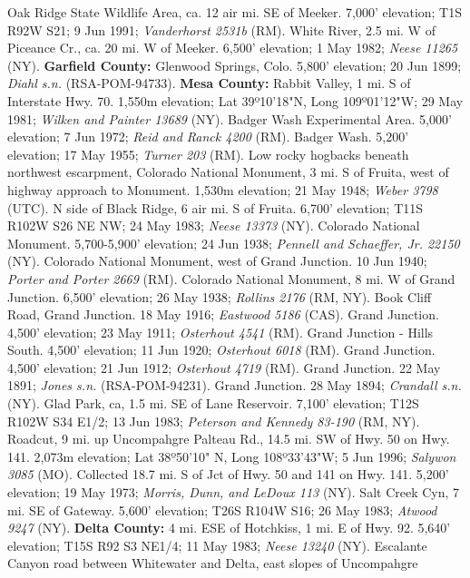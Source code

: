 Oak Ridge State Wildlife Area, ca. 12 air mi. SE of Meeker. 7,000' elevation;
T1S R92W S21; 9 Jun 1991; \textit{Vanderhorst 2531b} (RM).
White River, 2.5 mi. W of Piceance Cr., ca. 20 mi. W of Meeker.
6,500' elevation; 1 May 1982; \textit{Neese 11265} (NY).
  \textbf{Garfield County:}
Glenwood Springs, Colo. 5,800' elevation; 20 Jun 1899;
\textit{Diahl s.n.} (RSA-POM-94733).
  \textbf{Mesa County:}
Rabbit Valley, 1 mi. S of Interstate Hwy. 70. 1,550m elevation; Lat 39º10'18"N,
Long 109º01'12"W; 29 May 1981; \textit{Wilken and Painter 13689} (NY).
Badger Wash Experimental Area. 5,000' elevation; 7 Jun 1972;
\textit{Reid and Ranck 4200} (RM).
Badger Wash. 5,200' elevation; 17 May 1955; \textit{Turner 203} (RM).
Low rocky hogbacks beneath northwest escarpment, Colorado National Monument,
3 mi. S of Fruita, west of highway approach to Monument. 1,530m elevation;
21 May 1948; \textit{Weber 3798} (UTC).
N side of Black Ridge, 6 air mi. S of Fruita. 6,700' elevation;
T11S R102W S26 NE NW; 24 May 1983; \textit{Neese 13373} (NY).
Colorado National Monument. 5,700-5,900' elevation; 24 Jun 1938;
\textit{Pennell and Schaeffer, Jr. 22150} (NY).
Colorado National Monument, west of Grand Junction. 10 Jun 1940;
\textit{Porter and Porter 2669} (RM).
Colorado National Monument, 8 mi. W of Grand Junction. 6,500' elevation;
26 May 1938; \textit{Rollins 2176} (RM, NY).
Book Cliff Road, Grand Junction. 18 May 1916; \textit{Eastwood 5186} (CAS).
Grand Junction. 4,500' elevation; 23 May 1911; \textit{Osterhout 4541} (RM).
Grand Junction - Hills South. 4,500' elevation; 11 Jun 1920;
\textit{Osterhout 6018} (RM).
Grand Junction. 4,500' elevation; 21 Jun 1912; \textit{Osterhout 4719} (RM).
Grand Junction. 22 May 1891; \textit{Jones s.n.} (RSA-POM-94231).
Grand Junction. 28 May 1894; \textit{Crandall s.n.} (NY).
Glad Park, ca, 1.5 mi. SE of Lane Reservoir. 7,100' elevation;
T12S R102W S34 E1/2; 13 Jun 1983; \textit{Peterson and Kennedy 83-190} (RM, NY).
Roadcut, 9 mi. up Uncompahgre Palteau Rd., 14.5 mi. SW of Hwy. 50 on Hwy. 141.
2,073m elevation; Lat 38º50'10" N, Long 108º33'43"W; 5 Jun 1996;
\textit{Salywon 3085} (MO).
Collected 18.7 mi. S of Jct of Hwy. 50 and 141 on Hwy. 141. 5,200' elevation;
19 May 1973; \textit{Morris, Dunn, and LeDoux 113} (NY).
Salt Creek Cyn, 7 mi. SE of Gateway. 5,600' elevation; T26S R104W S16;
26 May 1983; \textit{Atwood 9247} (NY).
  \textbf{Delta County:}
4 mi. ESE of Hotchkiss, 1 mi. E of Hwy. 92. 5,640' elevation; T15S R92 S3 NE1/4;
11 May 1983; \textit{Neese 13240} (NY).
Escalante Canyon road between Whitewater and Delta, east slopes of Uncompahgre
